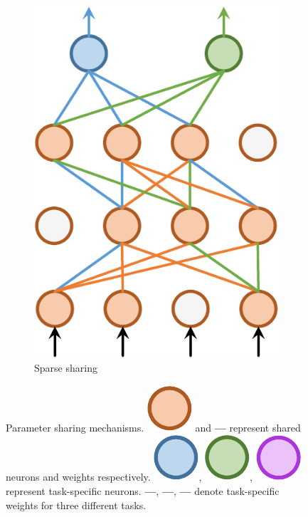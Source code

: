 \documentclass[letterpaper]{article} %
\begin{document}
\begin{figure}[htb]
\begin{subfigure}{0.45\linewidth}
        \includegraphics[scale=.36]{3353_sparse_sharing.pdf}
        \caption{Sparse sharing}
        \label{sfig:sparse-sharing}
        \end{subfigure}\hfill
	\caption{Parameter sharing mechanisms. \includegraphics[scale=0.25]{3353_shared_neuron.pdf} and \textcolor[rgb]{0.68,0.35,0.13}{\textbf{---}} represent shared neurons and weights respectively. \includegraphics[scale=0.25]{3353_taskA_neuron.pdf}, \includegraphics[scale=0.25]{3353_taskB_neuron.pdf}, \includegraphics[scale=0.25]{3353_taskC_neuron.pdf} represent task-specific neurons. \textcolor[rgb]{0.36,0.61,0.84}{\textbf{---}}, \textcolor[rgb]{0.44,0.68,0.28}{\textbf{---}}, \textcolor[rgb]{0.67,0.21,0.86}{\textbf{---}} denote task-specific weights for three different tasks.}
	\label{fig:param-sharing}
\end{figure}
\end{document}
